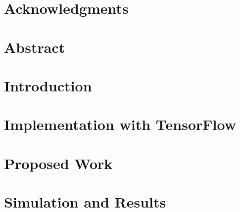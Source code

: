 \documentclass[11pt]{book}
\renewcommand{\baselinestretch}{1.2}
\begin{document}

 

 


\newpage
 \thispagestyle{empty}
\renewcommand{\thesisdedication}{{\large Copyright \copyright~~ The LNMIIT 2017\\}{\large All Rights Reserved\\}}
\thesisdedicationpage



\newpage
\thispagestyle{empty}
\renewcommand{\thesisdedication}{\large Dedicated to our amazing Faculty and supportive Seniors and Peers }
\thesisdedicationpage


\chapter*{Acknowledgments}
\label{ch:ack}


\chapter*{Abstract}
\label{ch:ack}



\tableofcontents

\chapter{Introduction}
\label{ch:intro}


\chapter{Implementation with TensorFlow}
\label{ch:reversible}


\chapter{Proposed Work}
\label{ch:new}


\chapter{Simulation and Results}
\label{ch:result}

\end{document}

